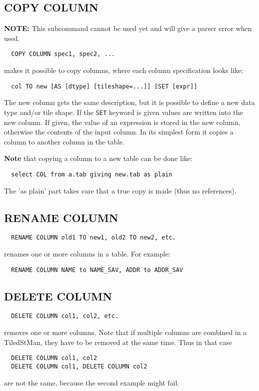 \subsection{COPY COLUMN}
{\bf NOTE:} This subcommand cannot be used yet and will give a parser
error when used.
\begin{verbatim}
  COPY COLUMN spec1, spec2, ...
\end{verbatim}
makes it possible to copy columns, where each column specification
looks like:
\begin{verbatim}
  col TO new [AS [dtype] [tileshape=...]] [SET [expr]]
\end{verbatim}
The new column gets the same description, but it is possible to define
a new data type and/or tile shape. If the \texttt{SET} keyword is
given values are written into the new column. If given, the value of an expression is
stored in the new column, otherwise the contents of the input column.
In its simplest form it copies a column to another column in the table.

{\bf Note} that copying a column to a new table can be done like:
\begin{verbatim}
  select COL from a.tab giving new.tab as plain
\end{verbatim}
The 'as plain' part takes care that a true copy is made (thus no references).

\subsection{RENAME COLUMN}
\begin{verbatim}
  RENAME COLUMN old1 TO new1, old2 TO new2, etc.
\end{verbatim}
renames one or more columns in a table.
For example:
\begin{verbatim}
  RENAME COLUMN NAME to NAME_SAV, ADDR to ADDR_SAV
\end{verbatim}

\subsection{DELETE COLUMN}
\begin{verbatim}
  DELETE COLUMN col1, col2, etc.
\end{verbatim}
removes one or more columns.
Note that if multiple columns are combined in a TiledStMan, they have
to be removed at the same time. Thus in that case
\begin{verbatim}
  DELETE COLUMN col1, col2
  DELETE COLUMN col1, DELETE COLUMN col2
\end{verbatim}
are not the same, because the second example might fail.

